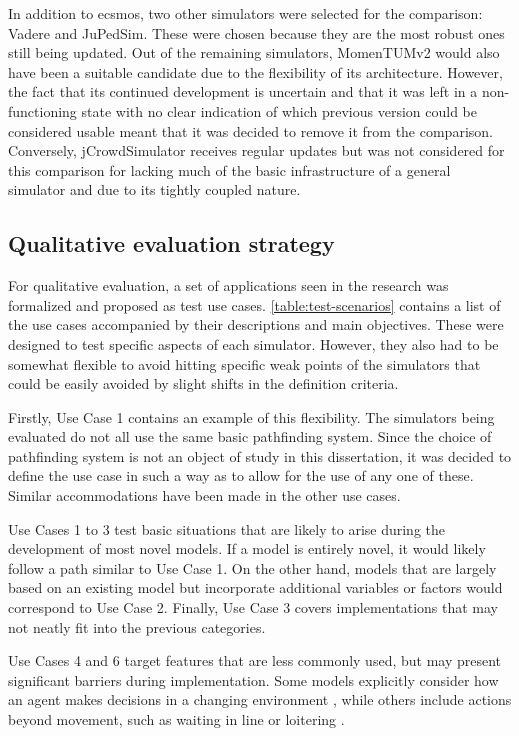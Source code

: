 \documentclass[twoside, 11pt]{article}
\begin{document}
In addition to \gls{ecsmos}, two other simulators were selected for the comparison: Vadere and JuPedSim. These were chosen because they are the most robust ones still being updated. Out of the remaining simulators, MomenTUMv2 would also have been a suitable candidate due to the flexibility of its architecture. However, the fact that its continued development is uncertain and that it was left in a non-functioning state with no clear indication of which previous version could be considered usable meant that it was decided to remove it from the comparison. Conversely, jCrowdSimulator receives regular updates but was not considered for this comparison for lacking much of the basic infrastructure of a general simulator and due to its tightly coupled nature.

\subsection{Qualitative evaluation strategy} \label{sec:qualitative-evaluation}

For qualitative evaluation, a set of applications seen in the research was formalized and proposed as test use cases. \autoref{table:test-scenarios} contains a list of the use cases accompanied by their descriptions and main objectives. These were designed to test specific aspects of each simulator. However, they also had to be somewhat flexible to avoid hitting specific weak points of the simulators that could be easily avoided by slight shifts in the definition criteria. 

Firstly, Use Case 1 contains an example of this flexibility. The simulators being evaluated do not all use the same basic pathfinding system. Since the choice of pathfinding system is not an object of study in this dissertation, it was decided to define the use case in such a way as to allow for the use of any one of these. Similar accommodations have been made in the other use cases. 

Use Cases 1 to 3 test basic situations that are likely to arise during the development of most novel models. If a model is entirely novel, it would likely follow a path similar to Use Case 1. On the other hand, models that are largely based on an existing model but incorporate additional variables or factors would correspond to Use Case 2. Finally, Use Case 3 covers implementations that may not neatly fit into the previous categories.

Use Cases 4 and 6 target features that are less commonly used, but may present significant barriers during implementation. Some models explicitly consider how an agent makes decisions in a changing environment \cite{DEIULIIS2023104527}, while others include actions beyond movement, such as waiting in line or loitering \cite{KIM2013232, ALAM2022100527}. 
\end{document}
